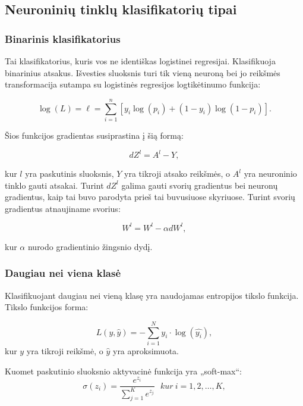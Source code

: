 \documentclass[a4paper, 12pt]{article}
\begin{document}
%
\subsection{Neuroninių tinklų klasifikatorių tipai}
%

%
\subsubsection{Binarinis klasifikatorius}
%

Tai klasifikatorius, kuris vos ne identiškas logistinei regresijai. Klasifikuoja binarinius atsakus. Išvesties sluoksnis turi tik vieną neuroną bei jo reikšmės transformacija sutampa su logistinės regresijos logtikėtinumo funkcija:

\begin{equation}
\log (L)=\ell=\sum_{i=1}^{n}\left[y_{i} \log \left(p_{i}\right)+\left(1-y_{i}\right) \log \left(1-p_{i}\right)\right].
\end{equation}

Šios funkcijos gradientas susiprastina į šią formą:

\begin{equation}
d Z^{l}=A^{l}-Y,
\end{equation}

kur $l$ yra paskutinis sluoksnis, $Y$ yra tikroji atsako reikšmės, o $A^l$ yra neuroninio tinklo gauti atsakai. Turint $dZ^l$ galima gauti svorių gradientus bei neuronų gradientus, kaip tai buvo parodyta prieš tai buvusiuose skyriuose. Turint svorių gradientus atnaujiname svorius:

\begin{equation}
W^{l}=W^{l}-\alpha dW^{l},
\end{equation}

kur $\alpha$ nurodo gradientinio žingsnio dydį.

%
\subsubsection{Daugiau nei viena klasė}
%

Klasifikuojant daugiau nei vieną klasę yra naudojamas entropijos tikslo funkcija. Tikslo funkcijos forma:

\begin{equation}
L(y, \hat{y})=-\sum_{i=1}^{N} y_i \cdot \log (\hat{y_i}),
\end{equation}
kur $y$ yra tikroji reikšmė, o $\hat{y}$ yra aproksimuota.


Kuomet paskutinio sluoksnio aktyvacinė funkcija yra „soft-max“:
\begin{equation}
\label{eqn:softmax}
\sigma(z_i) = \frac{e^{z_{i}}}{\sum_{j=1}^K e^{z_{j}}} \ \ \ kur \ i=1,2,\dots,K,
\end{equation}
\end{document}
